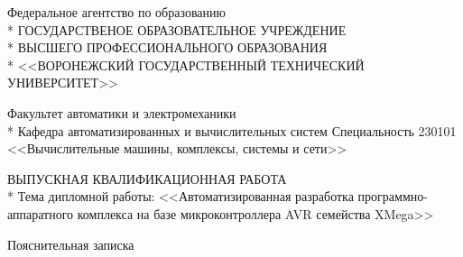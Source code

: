 \begin{center}
Федеральное агентство по образованию \\*
ГОСУДАРСТВЕНОЕ ОБРАЗОВАТЕЛЬНОЕ УЧРЕЖДЕНИЕ \\*
ВЫСШЕГО ПРОФЕССИОНАЛЬНОГО ОБРАЗОВАНИЯ \\*
<<ВОРОНЕЖСКИЙ ГОСУДАРСТВЕННЫЙ ТЕХНИЧЕСКИЙ УНИВЕРСИТЕТ>> \\
\end{center}
\begin{center}
Факультет  автоматики и электромеханики \\*
Кафедра автоматизированных и вычислительных систем
Специальность 230101 <<Вычислительные машины, комплексы, системы и сети>>
\end{center}

\vspace{2mm}

\begin{center}
ВЫПУСКНАЯ КВАЛИФИКАЦИОННАЯ РАБОТА \\*
Тема дипломной работы: <<Автоматизированная разработка программно-аппаратного комплекса
на базе микроконтроллера AVR семейства XMega>> \\
\end{center}


\begin{center}Пояснительная записка\end{center}


